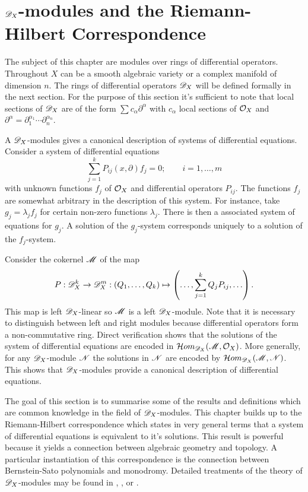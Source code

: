 \chapter{$\mathscr{D}_X$-modules and the Riemann-Hilbert Correspondence}\label{Ch: ChapterDX}
The subject of this chapter are modules over rings of differential operators.
Throughout $X$ can be a smooth algebraic variety or a complex manifold of dimension $n$.
The rings of differential operators $\mathscr{D}_X$ will be defined formally in the next section.
For the purpose of this section it's sufficient to note that local sections of $\mathscr{D}_X$ are of the form $\sum c_{\alpha } \partial^\alpha$ with $c_{\alpha}$ local sections of $\mathcal{O}_X$ and $\partial^\alpha = \partial_1^{\alpha_1}\cdots \partial_n^{\alpha_n}$.

A $\mathscr{D}_X$-modules gives a canonical description of systems of differential equations.
Consider a system of differential equations
$$\sum_{j=1}^k P_{ij}(x,\partial) f_j = 0; \qquad i= 1,\ldots,m$$
with unknown functions $f_j$ of $\mathcal{O}_X$ and differential operators $P_{ij}$.
The functions $f_j$ are somewhat arbitrary in the description of this system.
For instance, take $g_j=\lambda_j f_j$ for certain non-zero functions $\lambda_j$.
There is then a associated system of equations for $g_j$.
A solution of the $g_j$-system corresponds uniquely to a solution of the $f_j$-system.

Consider the cokernel $\mathscr{M}$ of the map
$$P:\mathscr{D}_X^k \to \mathscr{D}_X^m : \left(Q_1,\ldots, Q_k\right) \mapsto \left(\ldots, \sum_{j=1}^k Q_j P_{ij},\ldots\right).$$
This map is left $\mathscr{D}_X$-linear so $\mathscr{M}$ is a left $\mathscr{D}_X$-module.
Note that it is necessary to distinguish between left and right modules because differential operators form a non-commutative ring.
Direct verification shows that the solutions of the system of differential equations are encoded in $\mathcal{H}om_{\mathscr{D}_X}(\mathscr{M},\mathcal{O}_X)$.
More generally, for any $\mathscr{D}_X$-module $\mathscr{N}$ the solutions in $\mathscr{N}$ are encoded by $\mathcal{H}om_{\mathscr{D}_X}(\mathscr{M},\mathscr{N})$.
This shows that $\mathscr{D}_X$-modules provide a canonical description of differential equations.

The goal of this section is to summarise some of the results and definitions which are common knowledge in the field of $\mathscr{D}_X$-modules.
This chapter builds up to the Riemann-Hilbert correspondence which states in very general terms that a system of differential equations is equivalent to it's solutions.
This result is powerful because it yields a connection between algebraic geometry and topology.
A particular instantiation of this correspondence is the connection between Bernstein-Sato polynomials and monodromy.
Detailed treatments of the theory of $\mathscr{D}_X$-modules may be found in  \cite{bjork1979rings}, \cite{kashiwara2003d}, \cite{hotta2007d} or \cite{borel1987algebraic}.

